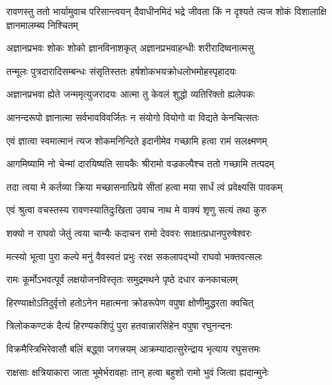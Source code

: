 


\addtocounter{shlokacount}{35}


\threelineshloka
{रावणस्तु ततो भार्यामुवाच परिसान्त्वयन्}
{दैवाधीनमिदं भद्रे जीवता किं न दृश्यते}
{त्यज शोकं विशालाक्षि ज्ञानमालम्ब्य निश्चितम्} %

\twolineshloka
{अज्ञानप्रभवः शोकः शोको ज्ञानविनाशकृत्}
{अज्ञानप्रभवाहन्धीः शरीरादिष्वनात्मसु} %

\twolineshloka
{तन्मूलः पुत्रदारादिसम्बन्धः संसृतिस्ततः}
{हर्षशोकभयक्रोधलोभमोहस्पृहादयः} %

\twolineshloka
{अज्ञानप्रभवा ह्येते जन्ममृत्युजरादयः}
{आत्मा तु केवलं शुद्धो व्यतिरिक्तो ह्यलेपकः} %

\twolineshloka
{आनन्दरूपो ज्ञानात्मा सर्वभावविवर्जितः}
{न संयोगो वियोगो वा विद्यते केनचित्सतः} %

\twolineshloka
{एवं ज्ञात्वा स्वमात्मानं त्यज शोकमनिन्दिते}
{इदानीमेव गच्छामि हत्वा रामं सलक्ष्मणम्} %

\twolineshloka
{आगमिष्यामि नो चेन्मां दारयिष्यति सायकैः}
{श्रीरामो वज्रकल्पैश्च ततो गच्छामि तत्पदम्} %

\twolineshloka
{तदा त्वया मे कर्तव्या क्रिया मच्छासनात्प्रिये}
{सीतां हत्वा मया सार्धं त्वं प्रवेक्ष्यसि पावकम्} %

\twolineshloka
{एवं श्रुत्वा वचस्तस्य रावणस्यातिदुःखिता}
{उवाच नाथ मे वाक्यं शृणु सत्यं तथा कुरु} %

\twolineshloka
{शक्यो न राघवो जेतुं त्वया चान्यैः कदाचन}
{रामो देववरः साक्षात्प्रधानपुरुषेश्वरः} %

\twolineshloka
{मत्स्यो भूत्वा पुरा कल्पे मनुं वैवस्वतं प्रभुः}
{ररक्ष सकलापद्भ्यो राघवो भक्तवत्सलः} %

\twolineshloka
{रामः कूर्मोऽभवत्पूर्वं लक्षयोजनविस्तृतः}
{समुद्रमथने पृष्ठे दधार कनकाचलम्} %

\twolineshloka
{हिरण्याक्षोऽतिदुर्वृत्तो हतोऽनेन महात्मना}
{क्रोडरूपेण वपुषा क्षोणीमुद्धरता क्वचित्} %

\twolineshloka
{त्रिलोककण्टकं दैत्यं हिरण्यकशिपुं पुरा}
{हतवान्नारसिंहेन वपुषा रघुनन्दनः} %

\twolineshloka
{विक्रमैस्त्रिभिरेवासौ बलिं बद्ध्वा जगत्त्रयम्}
{आक्रम्यादात्सुरेन्द्राय भृत्याय रघुसत्तमः} %

\twolineshloka
{राक्षसाः क्षत्रियाकारा जाता भूमेर्भरावहाः}
{तान् हत्वा बहुशो रामो भुवं जित्वा ह्यदान्मुनेः} %

